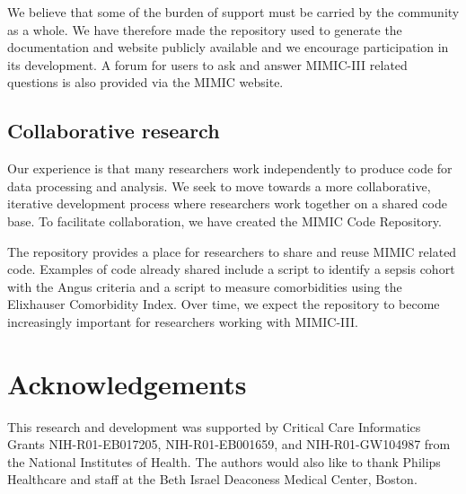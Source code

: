 \documentclass[english]{article}
\begin{document}
We believe that some of the burden of support must be carried by the community as a whole. We have therefore made the repository used to generate the documentation and website publicly available and we encourage participation in its development. A forum for users to ask and answer MIMIC-III related questions is also provided via the MIMIC website.


\subsection*{Collaborative research}

Our experience is that many researchers work independently to produce code for data processing and analysis. We seek to move towards a more collaborative, iterative development process where researchers work together on a shared code base. To facilitate collaboration, we have created the MIMIC Code Repository.

The repository provides a place for researchers to share and reuse MIMIC related code. Examples of code already shared include a script to identify a sepsis cohort with the Angus criteria and a script to measure comorbidities using the Elixhauser Comorbidity Index. Over time, we expect the repository to become increasingly important for researchers working with MIMIC-III.


\section*{Acknowledgements}


This research and development was supported by Critical Care Informatics Grants NIH-R01-EB017205, NIH-R01-EB001659, and NIH-R01-GW104987 from the National Institutes of Health. The authors would also like to thank Philips Healthcare and staff at the Beth Israel Deaconess Medical Center, Boston.
\end{document}
